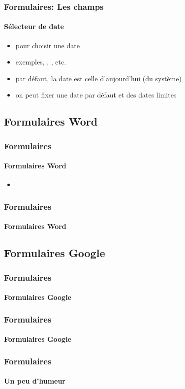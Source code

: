 \documentclass[xcolor=table]{beamer}
\begin{document}
\begin{frame}
\frametitle{Formulaires: Les champs}
\framesubtitle{Sélecteur de date}

\begin{minipage}{0.50\textwidth}
	\begin{itemize}
		\item pour choisir une date
		\item exemples, , , etc.
		\item par défaut, la date est celle d'aujourd'hui (du système)
		\item on peut fixer une date par défaut et des dates limites
	\end{itemize}
\end{minipage}
\begin{minipage}{0.49\textwidth}
\end{minipage}


\end{frame}

\subsection{Formulaires Word}

\begin{frame}
\frametitle{Formulaires}
\framesubtitle{Formulaires Word}


\begin{itemize}
	\item 
\end{itemize}


\end{frame}

\begin{frame}
\frametitle{Formulaires}
\framesubtitle{Formulaires Word}

\end{frame}

\subsection{Formulaires Google}

\begin{frame}
\frametitle{Formulaires}
\framesubtitle{Formulaires Google}

\end{frame}

\begin{frame}
\frametitle{Formulaires}
\framesubtitle{Formulaires Google}

\end{frame}


\begin{frame}
\frametitle{Formulaires}
\framesubtitle{Un peu d'humeur}
\begin{center}
\end{center}
\end{frame}


\end{document}
